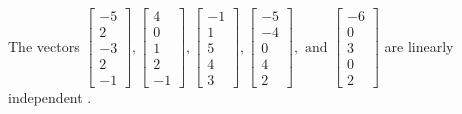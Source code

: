 \begin{exercise}
\begin{exerciseStatement}
  \end{exerciseStatement}
  \begin{exerciseAnswer}
   The vectors \(\left[\begin{array}{r}
-5 \\
2 \\
-3 \\
2 \\
-1
\end{array}\right] , \left[\begin{array}{r}
4 \\
0 \\
1 \\
2 \\
-1
\end{array}\right] , \left[\begin{array}{r}
-1 \\
1 \\
5 \\
4 \\
3
\end{array}\right] , \left[\begin{array}{r}
-5 \\
-4 \\
0 \\
4 \\
2
\end{array}\right] , \text{ and } \left[\begin{array}{r}
-6 \\
0 \\
3 \\
0 \\
2
\end{array}\right]\) are 
  	 linearly independent  .
  


  \end{exerciseAnswer}
\end{exercise}